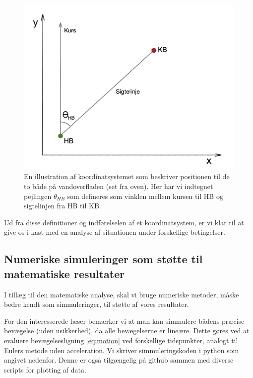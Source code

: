 \documentclass[%
 reprint,
nofootinbib,
aps,
]{revtex4-1}
\begin{document}
\begin{figure}[H]
  \includegraphics[width=\linewidth]{figures/metode_tegning.png}
  \caption{En illustration af koordinatsystemet som beskriver positionen til de to både på vandoverfladen (set fra oven). Her har vi indtegnet pejlingen $\theta_{HB}$ som defineres som vinklen mellem kursen til HB og sigtelinjen fra HB til KB.}
  \label{fig:metode_tegning}
\end{figure}
Ud fra disse definitioner og indførelselen af et koordinatsystem, er vi klar til at give os i kast med en analyse af situationen under forskellige betingelser.

\subsection{Numeriske simuleringer som støtte til matematiske resultater}\label{sec:numerical_method}
I tillæg til den matematiske analyse, skal vi bruge numeriske metoder, måske bedre kendt som simmuleringer, til støtte af vores resultater. \par
For den interesserede læser bemærker vi at man kan simmulere bådens præcise bevægelse (uden usikkerhed), da alle bevægelserne er lineære. Dette gøres ved at evaluere bevægelsesligning \ref{eq:motion} ved forskellige tidspunkter, analogt til Eulers metode uden acceleration. Vi skriver simmuleringskoden i python som angivet nedenfor. Denne er også tilgængelig på github \cite{github} sammen med diverse scripts for plotting af data.
\end{document}
